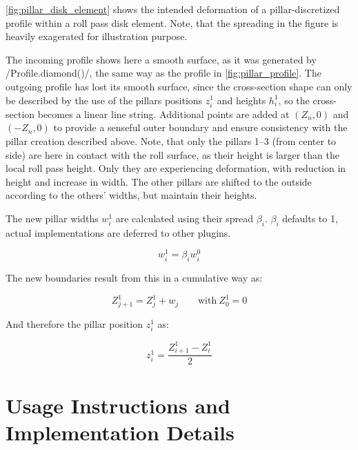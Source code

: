 \documentclass[11pt]{PyRollDocs}
\begin{document}
    \autoref{fig:pillar_disk_element} shows the intended deformation of a pillar-discretized profile within a roll pass disk element.
    Note, that the spreading in the figure is heavily exagerated for illustration purpose.

    The incoming profile shows here a smooth surface, as it was generated by \py/Profile.diamond()/, the same way as the profile in \autoref{fig:pillar_profile}.
    The outgoing profile has lost its smooth surface, since the cross-section shape can only be described by the use of the pillars positions $z_i^1$ and heights $h_i^1$, so the cross-section becomes a linear line string.
    Additional points are added at $(Z_n, 0)$ and $(-Z_n, 0)$ to provide a senseful outer boundary and ensure consistency with the pillar creation described above.
    Note, that only the pillars 1--3 (from center to side) are here in contact with the roll surface, as their height is larger than the local roll pass height.
    Only they are experiencing deformation, with reduction in height and increase in width.
    The other pillars are shifted to the outside according to the others' widths, but maintain their heights.

    The new pillar widths $w_i^1$ are calculated using their spread $\beta_i$. $\beta_i$ defaults to \num{1}, actual implementations are deferred to other plugins.

    \begin{equation}
        w_i^1 = \beta_i w_i^0
        \label{eq:spread}
    \end{equation}

    The new boundaries result from this in a cumulative way as:

    \begin{equation}
        Z_{j+1}^1 = Z_j^1 + w_j \qquad \text{with}\ Z_0^1 = 0
        \label{eq:boundaries1}
    \end{equation}

    And therefore the pillar position $z_i^1$ as:

    \begin{equation}
        z_i^1 = \frac{Z^1_{i+1} - Z^1_i}{2}
        \label{eq:pillars1}
    \end{equation}


    \section{Usage Instructions and Implementation Details}\label{sec:usage-instructions}
\end{document}
